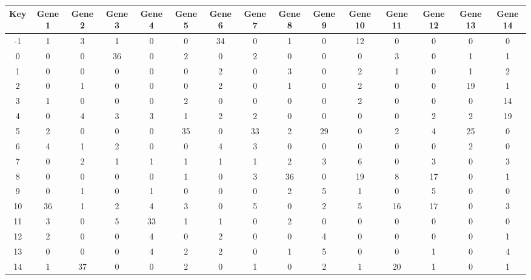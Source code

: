 \begin{tabular}{|c|c|c|c|c|c|c|c|c|c|c|c|c|c|c|}
\hline
Key & Gene 1 & Gene 2 & Gene 3 & Gene 4 & Gene 5 & Gene 6 & Gene 7 & Gene 8 & Gene 9 & Gene 10 & Gene 11 & Gene 12 & Gene 13 & Gene 14 \\
\hline
-1 & 1 & 3 & 1 & 0 & 0 & 34 & 0 & 1 & 0 & 12 & 0 & 0 & 0 & 0 \\
0 & 0 & 0 & 36 & 0 & 2 & 0 & 2 & 0 & 0 & 0 & 3 & 0 & 1 & 1 \\
1 & 0 & 0 & 0 & 0 & 0 & 2 & 0 & 3 & 0 & 2 & 1 & 0 & 1 & 2 \\
2 & 0 & 1 & 0 & 0 & 0 & 2 & 0 & 1 & 0 & 2 & 0 & 0 & 19 & 1 \\
3 & 1 & 0 & 0 & 0 & 2 & 0 & 0 & 0 & 0 & 2 & 0 & 0 & 0 & 14 \\
4 & 0 & 4 & 3 & 3 & 1 & 2 & 2 & 0 & 0 & 0 & 0 & 2 & 2 & 19 \\
5 & 2 & 0 & 0 & 0 & 35 & 0 & 33 & 2 & 29 & 0 & 2 & 4 & 25 & 0 \\
6 & 4 & 1 & 2 & 0 & 0 & 4 & 3 & 0 & 0 & 0 & 0 & 0 & 2 & 0 \\
7 & 0 & 2 & 1 & 1 & 1 & 1 & 1 & 2 & 3 & 6 & 0 & 3 & 0 & 3 \\
8 & 0 & 0 & 0 & 0 & 1 & 0 & 3 & 36 & 0 & 19 & 8 & 17 & 0 & 1 \\
9 & 0 & 1 & 0 & 1 & 0 & 0 & 0 & 2 & 5 & 1 & 0 & 5 & 0 & 0 \\
10 & 36 & 1 & 2 & 4 & 3 & 0 & 5 & 0 & 2 & 5 & 16 & 17 & 0 & 3 \\
11 & 3 & 0 & 5 & 33 & 1 & 1 & 0 & 2 & 0 & 0 & 0 & 0 & 0 & 0 \\
12 & 2 & 0 & 0 & 4 & 0 & 2 & 0 & 0 & 4 & 0 & 0 & 0 & 0 & 1 \\
13 & 0 & 0 & 0 & 4 & 2 & 2 & 0 & 1 & 5 & 0 & 0 & 1 & 0 & 4 \\
14 & 1 & 37 & 0 & 0 & 2 & 0 & 1 & 0 & 2 & 1 & 20 & 1 & 0 & 1 \\
\hline
\end{tabular}